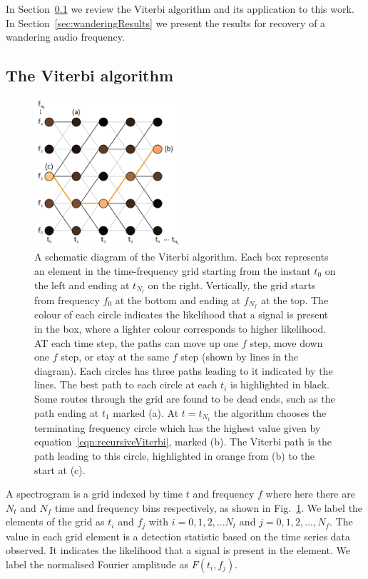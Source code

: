\documentclass[paper-main.tex]{subfiles}
\begin{document}
In Section~\ref{sec:viterbi} we review the Viterbi algorithm and its application to this work. 
In Section~\ref{sec:wanderingResults} we present the results for recovery of a wandering audio frequency. 




\subsection{The Viterbi algorithm}
\label{sec:viterbi}

\begin{figure}
\includegraphics[width=0.49\textwidth]{figures/viterbiDiagram.pdf}
\caption{\label{fig:viterbi}
A schematic diagram of the Viterbi algorithm. 
Each box represents an element in the time-frequency grid starting from the instant $t_0$ on the left and ending at $t_{N_t}$ on the right. 
Vertically, the grid starts from frequency $f_0$ at the bottom and ending at $f_{N_f}$ at the top. 
The colour of each circle indicates the likelihood that a signal is present in the box, where a lighter colour corresponds to higher likelihood. 
AT each time step, the paths can move up one $f$ step, move down one $f$ step, or stay at the same $f$ step (shown by lines in the diagram). 
Each circles has three paths leading to it indicated by the lines. 
The best path to each circle at each $t_i$ is highlighted in black. 
Some routes through the grid are found to be dead ends, such as the path ending at $t_1$ marked (a). 
At $t=t_{N_t}$ the algorithm chooses the terminating frequency circle which has the highest value given by equation~\ref{eqn:recursiveViterbi}, marked (b). 
The Viterbi path is the path leading to this circle, highlighted in orange from (b) to the start at (c). 
}
\end{figure}

A spectrogram is a grid indexed by time $t$ and frequency $f$ where here there are $N_t$ and $N_f$ time and frequency bins respectively, as shown in Fig.~\ref{fig:viterbi}.
We label the elements of the grid as $t_i$ and $f_j$ with $i=0,1,2,...N_t$ and $j=0,1,2,...,N_f$. 
The value in each grid element is a detection statistic based on the time series data observed. 
It indicates the likelihood that a signal is present in the element. 
We label the normalised Fourier amplitude as $F(t_i,f_j)$. 
\end{document}
